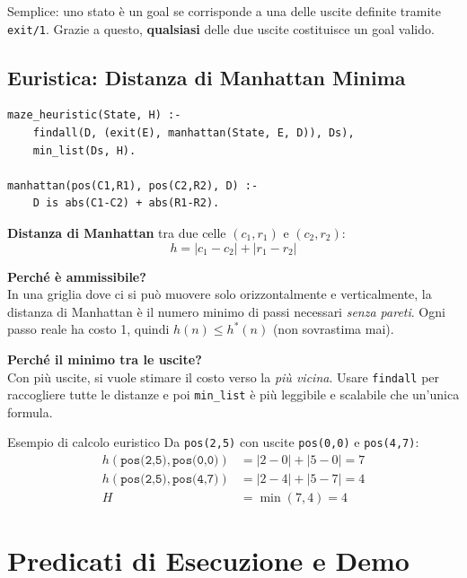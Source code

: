 \documentclass[12pt,a4paper]{article}
\begin{document}
Semplice: uno stato è un goal se corrisponde a una delle uscite definite
tramite \texttt{exit/1}. Grazie a questo, \textbf{qualsiasi} delle due uscite
costituisce un goal valido.

\subsection{Euristica: Distanza di Manhattan Minima}

\begin{lstlisting}
maze_heuristic(State, H) :-
    findall(D, (exit(E), manhattan(State, E, D)), Ds),
    min_list(Ds, H).

manhattan(pos(C1,R1), pos(C2,R2), D) :-
    D is abs(C1-C2) + abs(R1-R2).
\end{lstlisting}

\textbf{Distanza di Manhattan} tra due celle $(c_1, r_1)$ e $(c_2, r_2)$:
\[
  h = |c_1 - c_2| + |r_1 - r_2|
\]

\noindent\textbf{Perché è ammissibile?} \\
In una griglia dove ci si può muovere solo orizzontalmente e verticalmente,
la distanza di Manhattan è il numero minimo di passi necessari \emph{senza pareti}.
Ogni passo reale ha costo 1, quindi $h(n) \le h^*(n)$ (non sovrastima mai).

\noindent\textbf{Perché il minimo tra le uscite?} \\
Con più uscite, si vuole stimare il costo verso la \emph{più vicina}. Usare
\texttt{findall} per raccogliere tutte le distanze e poi \texttt{min\_list} è
più leggibile e scalabile che un'unica formula.

\begin{exbox}{Esempio di calcolo euristico}
Da \texttt{pos(2,5)} con uscite \texttt{pos(0,0)} e \texttt{pos(4,7)}:
\begin{align*}
  h(\texttt{pos(2,5)}, \texttt{pos(0,0)}) &= |2-0| + |5-0| = 7\\
  h(\texttt{pos(2,5)}, \texttt{pos(4,7)}) &= |2-4| + |5-7| = 4\\
  H &= \min(7, 4) = 4
\end{align*}
\end{exbox}

\section{Predicati di Esecuzione e Demo}
\end{document}
